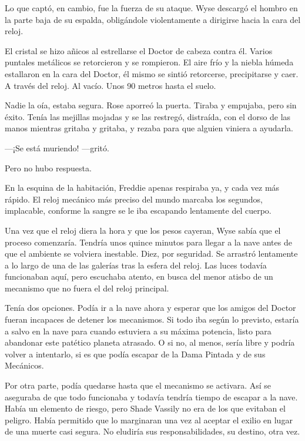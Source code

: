 {Lo que captó, en cambio, fue la fuerza de su ataque. Wyse descargó el
	hombro en la parte baja de su espalda, obligándole violentamente a
dirigirse hacia la cara del reloj.}

{El cristal se hizo añicos al estrellarse el Doctor de cabeza contra él.
	Varios puntales metálicos se retorcieron y se rompieron. El aire frío y
	la niebla húmeda estallaron en la cara del Doctor, él mismo se sintió
	retorcerse, precipitarse y caer. A través del reloj. Al vacío. Unos 90
metros hasta el suelo.}

\mbox{}

{Nadie la oía, estaba segura. Rose aporreó la puerta. Tiraba y empujaba,
	pero sin éxito. Tenía las mejillas mojadas y se las restregó, distraída,
	con el dorso de las manos mientras gritaba y gritaba, y rezaba para que
alguien viniera a ayudarla.}

{---¡Se está muriendo! ---gritó.}

{Pero no hubo respuesta.}

{En la esquina de la habitación, Freddie apenas respiraba ya, y cada vez
	más rápido. El reloj mecánico más preciso del mundo marcaba los
	segundos, implacable, conforme la sangre se le iba escapando lentamente
del cuerpo.}

{Una vez que el reloj diera la hora y que los pesos cayeran, Wyse sabía
	que el proceso comenzaría. Tendría unos quince minutos para llegar a la
	nave antes de que el ambiente se volviera inestable. Diez, por
	seguridad. Se arrastró lentamente a lo largo de una de las galerías tras
	la esfera del reloj. Las luces todavía funcionaban aquí, pero escuchaba
	atento, en busca del menor atisbo de un mecanismo que no fuera el del
reloj principal.}

{Tenía dos opciones. Podía ir a la nave ahora y esperar que los amigos
	del Doctor fueran incapaces de detener los mecanismos. Si todo iba según
	lo previsto, estaría a salvo en la nave para cuando estuviera a su
	máxima potencia, listo para abandonar este patético planeta atrasado. O
	si no, al menos, sería libre y podría volver a intentarlo, si es que
podía escapar de la Dama Pintada y de sus Mecánicos.}

{Por otra parte, podía quedarse hasta que el mecanismo se activara. Así
	se aseguraba de que todo funcionaba y todavía tendría tiempo de escapar
	a la nave. Había un elemento de riesgo, pero Shade Vassily no era de los
	que evitaban el peligro. Había permitido que lo marginaran una vez al
	aceptar el exilio en lugar de una muerte casi segura. No eludiría sus
responsabilidades, su destino, otra vez.}

